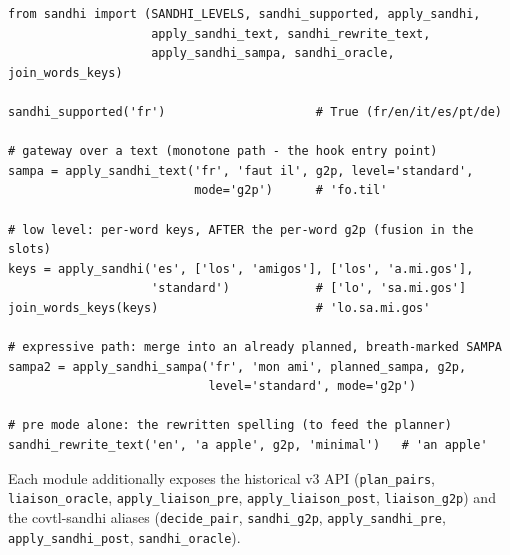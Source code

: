 \documentclass[11pt,a4paper]{report}
\newcommand{\smp}[1]{\texttt{#1}}          %
\begin{document}
\begin{verbatim}
from sandhi import (SANDHI_LEVELS, sandhi_supported, apply_sandhi,
                    apply_sandhi_text, sandhi_rewrite_text,
                    apply_sandhi_sampa, sandhi_oracle, join_words_keys)

sandhi_supported('fr')                     # True (fr/en/it/es/pt/de)

# gateway over a text (monotone path - the hook entry point)
sampa = apply_sandhi_text('fr', 'faut il', g2p, level='standard',
                          mode='g2p')      # 'fo.til'

# low level: per-word keys, AFTER the per-word g2p (fusion in the slots)
keys = apply_sandhi('es', ['los', 'amigos'], ['los', 'a.mi.gos'],
                    'standard')            # ['lo', 'sa.mi.gos']
join_words_keys(keys)                      # 'lo.sa.mi.gos'

# expressive path: merge into an already planned, breath-marked SAMPA
sampa2 = apply_sandhi_sampa('fr', 'mon ami', planned_sampa, g2p,
                            level='standard', mode='g2p')

# pre mode alone: the rewritten spelling (to feed the planner)
sandhi_rewrite_text('en', 'a apple', g2p, 'minimal')   # 'an apple'
\end{verbatim}

Each module additionally exposes the historical v3 API
(\smp{plan\_pairs}, \smp{liaison\_oracle}, \smp{apply\_liaison\_pre},
\smp{apply\_liaison\_post}, \smp{liaison\_g2p}) and the covtl-sandhi aliases
(\smp{decide\_pair}, \smp{sandhi\_g2p}, \smp{apply\_sandhi\_pre},
\smp{apply\_sandhi\_post}, \smp{sandhi\_oracle}).
\end{document}
